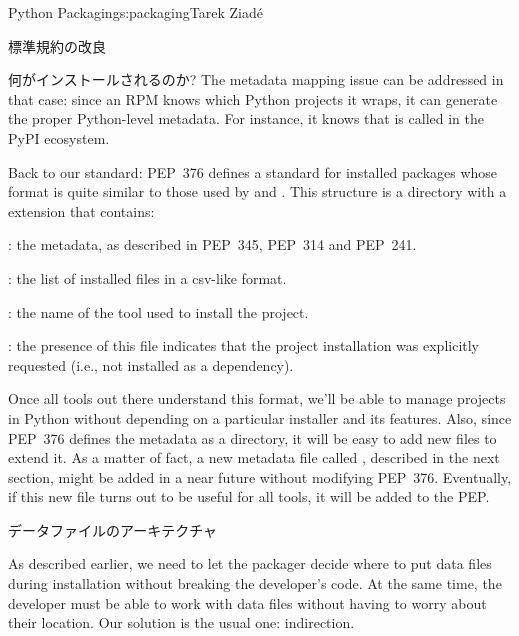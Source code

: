 \begin{aosachapter}{Python Packaging}{s:packaging}{Tarek Ziad\'{e}}
\begin{aosasect1}{標準規約の改良}
\begin{aosasect2}{何がインストールされるのか?}
The metadata mapping issue can be addressed in that case: since an RPM
knows which Python projects it wraps, it can generate the proper
Python-level metadata. For instance, it knows that
 is called  in the PyPI ecosystem.

Back to our standard: PEP~376 defines a standard for installed
packages whose format is quite similar to those used by
 and .  This structure is a directory with
a  extension that contains:

\begin{aosaitemize}

  \item {}: the metadata, as described in PEP~345, PEP~314
  and PEP~241.

  \item {}: the list of installed files in a csv-like format.

  \item {}: the name of the tool used to install the
  project.

  \item {}: the presence of this file indicates that the
  project installation was explicitly requested (i.e., not installed
  as a dependency).

\end{aosaitemize}

\noindent
Once all tools out there understand this format, we'll be able to
manage projects in Python without depending on a particular installer
and its features.  Also, since PEP~376 defines the metadata as a
directory, it will be easy to add new files to extend it.  As a matter
of fact, a new metadata file called , described in the
next section, might be added in a near future without modifying
PEP~376. Eventually, if this new file turns out to be useful for all
tools, it will be added to the PEP.

\end{aosasect2}

\begin{aosasect2}{データファイルのアーキテクチャ}

As described earlier, we need to let the packager decide where to put
data files during installation without breaking the developer's
code. At the same time, the developer must be able to work with data
files without having to worry about their location.  Our solution is
the usual one: indirection.


\end{aosasect2}
\end{aosasect1}
\end{aosachapter}
